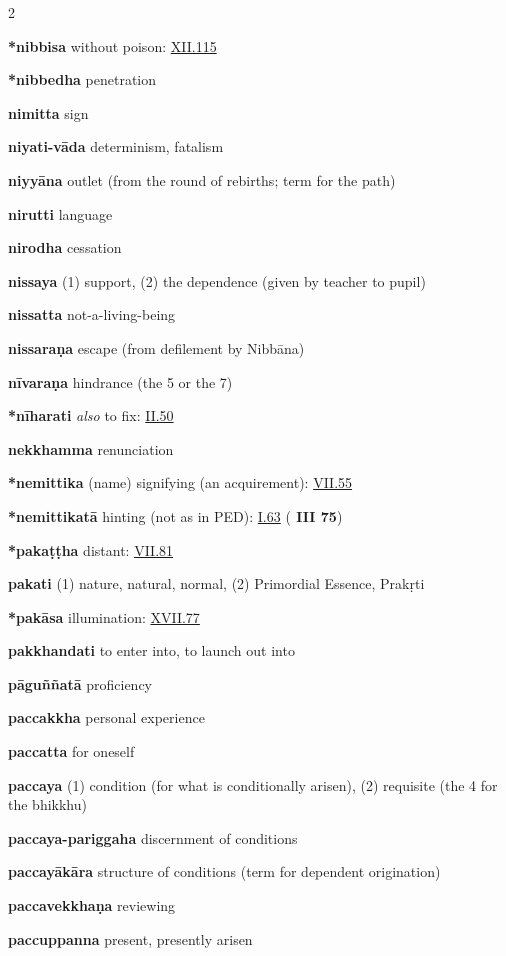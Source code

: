 \begin{multicols}{2}
\begin{vismHanging}
\par\textbf{*nibbisa} without poison: \hyperlink{XII.115}{XII.115}{} 
\par\textbf{*nibbedha} penetration 
\par\textbf{nimitta} sign
\par\textbf{niyati-vāda} determinism, fatalism
\par\textbf{niyyāna} outlet (from the round of rebirths; term for the path) 
\par\textbf{nirutti} language
\par\textbf{nirodha} cessation
\par\textbf{nissaya} (1) support, (2) the dependence (given by teacher to pupil) 
\par\textbf{nissatta} not-a-living-being
\par\textbf{nissaraṇa} escape (from defilement by Nibbāna) 
\par\textbf{nīvaraṇa} hindrance (the 5 or the 7)
\par\textbf{*nīharati} \emph{also }to fix: \hyperlink{II.50}{II.50}{}
\par\textbf{nekkhamma} renunciation
\par\textbf{*nemittika} (name) signifying (an acquirement): \hyperlink{VII.55}{VII.55}{} 
\par\textbf{*nemittikatā} hinting (not as in PED): \hyperlink{I.63}{I.63}{} (\textbf{\cite{M} III 75}) 
\par\textbf{*pakaṭṭha} distant: \hyperlink{VII.81}{VII.81}{}
\par\textbf{pakati} (1) nature, natural, normal, (2) Primordial Essence, Prakṛti
\par\textbf{*pakāsa} illumination: \hyperlink{XVII.77}{XVII.77}{}
\par\textbf{pakkhandati} to enter into, to launch out into 
\par\textbf{pāguññatā} proficiency
\par\textbf{paccakkha} personal experience
\par\textbf{paccatta} for oneself
\par\textbf{paccaya} (1) condition (for what is conditionally arisen), (2) requisite (the 4 for the bhikkhu) 
\par\textbf{paccaya-pariggaha} discernment of conditions 
\par\textbf{paccayākāra} structure of conditions (term for dependent origination) 
\par\textbf{paccavekkhaṇa} reviewing
\par\textbf{paccuppanna} present, presently arisen

\end{vismHanging}
\end{multicols}
